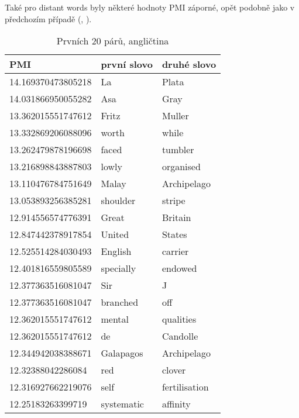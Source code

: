 \documentclass[12pt, a4paper]{report}
\theoremstyle{remark}
\begin{document}
Také pro distant words byly některé hodnoty PMI záporné, opět podobně jako v předchozím případě (, ).
\begin{table}[h!]
\begin{tabular}{lll}
         PMI & první slovo & druhé slovo \\
\toprule
14.169370473805218 & La & Plata \\
14.031866950055282 & Asa & Gray \\
13.362015551747612 & Fritz & Muller \\
13.332869206088096 & worth & while \\
13.262479878196698 & faced & tumbler \\
13.216898843887803 & lowly & organised \\
13.110476784751649 & Malay & Archipelago \\
13.053893256385281 & shoulder & stripe \\
12.914556574776391 & Great & Britain \\
12.847442378917854 & United & States \\
12.525514284030493 & English & carrier \\
12.401816559805589 & specially & endowed \\
12.377363516081047 & Sir & J \\
12.377363516081047 & branched & off \\
12.362015551747612 & mental & qualities \\
12.362015551747612 & de & Candolle \\
12.344942038388671 & Galapagos & Archipelago \\
12.32388042286084 & red & clover \\
12.316927662219076 & self & fertilisation \\
12.25183263399719 & systematic & affinity \\
\end{tabular}
\caption{Prvních 20 párů, angličtina}
\end{table}
\end{document}
